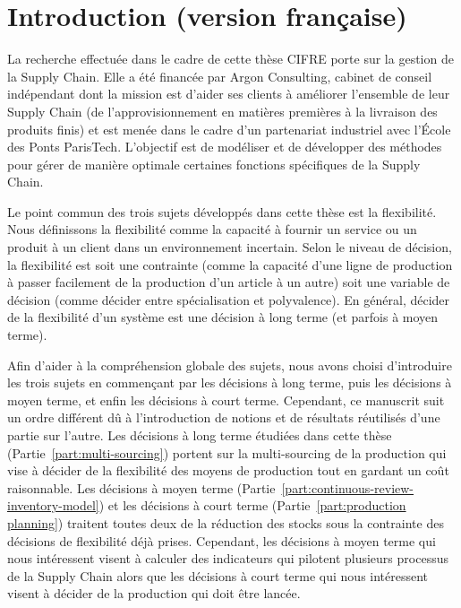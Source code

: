 \chapter{Introduction (version française)}
\label{chap:intro:fr}


La recherche effectuée dans le cadre de cette thèse CIFRE porte sur la gestion de la Supply Chain.
Elle a été financée par Argon Consulting, cabinet de conseil indépendant dont la mission est d'aider ses clients à améliorer l'ensemble de leur Supply Chain (de l'approvisionnement en matières premières à la livraison des produits finis) et est menée dans le cadre d'un partenariat industriel avec l'\'Ecole des Ponts ParisTech.
L'objectif est de modéliser et de développer des méthodes pour gérer de manière optimale certaines fonctions spécifiques de la Supply Chain.


Le point commun des trois sujets développés dans cette thèse est la flexibilité.
Nous définissons la flexibilité comme la capacité à fournir un service ou un produit à un client dans un environnement incertain.
Selon le niveau de décision, la flexibilité est soit une contrainte (comme la capacité d'une ligne de production à passer facilement de la production d'un article à un autre) soit une variable de décision (comme décider entre spécialisation et polyvalence).
En général, décider de la flexibilité d'un système est une décision à long terme (et parfois à moyen terme).


Afin d'aider à la compréhension globale des sujets, nous avons choisi d'introduire les trois sujets en commençant par les décisions à long terme, puis les décisions à moyen terme, et enfin les décisions à court terme.
Cependant, ce manuscrit suit un ordre différent dû à l'introduction de notions et de résultats réutilisés d'une partie sur l'autre.
Les décisions à long terme étudiées dans cette thèse (Partie~\ref{part:multi-sourcing}) portent sur la multi-sourcing de la production qui vise à décider de la flexibilité des moyens de production tout en gardant un coût raisonnable.
Les décisions à moyen terme (Partie~\ref{part:continuous-review-inventory-model}) et les décisions à court terme (Partie~\ref{part:production planning}) traitent toutes deux de la réduction des stocks sous la contrainte des décisions de flexibilité déjà prises.
Cependant, les décisions à moyen terme qui nous intéressent visent à calculer des indicateurs qui pilotent plusieurs processus de la Supply Chain alors que les décisions à court terme qui nous intéressent visent à décider de la production qui doit être lancée.


